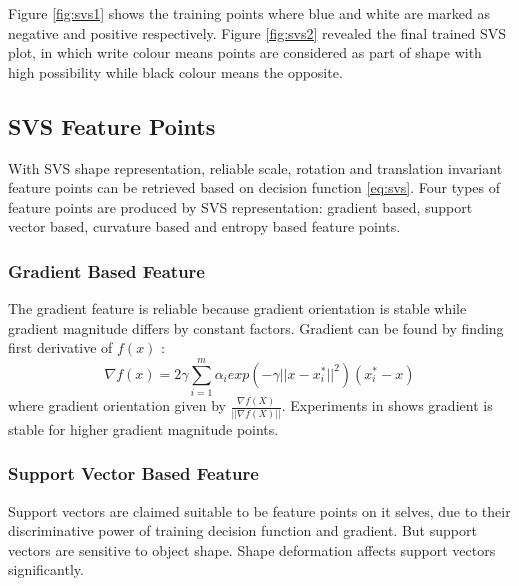 Figure \ref{fig:svs1} shows the training points where blue and white are marked as negative and positive respectively. Figure \ref{fig:svs2} revealed the final trained SVS plot, in which write colour means points are considered as part of shape with high possibility while black colour means the opposite.

\subsection{SVS Feature Points}
With SVS shape representation, reliable scale, rotation and translation invariant feature points can be retrieved based on decision function \ref{eq:svs}. Four types of feature points are produced by SVS representation: gradient based, support vector based, curvature based and entropy based feature points.

\subsubsection{Gradient Based Feature}
The gradient feature is reliable because gradient orientation is stable while gradient magnitude differs by constant factors. Gradient can be found by finding first derivative of $f(x)$ \cite{Nguyen2013}:
\begin{equation}
\label{eq:svsgrad}
\nabla f(x)=2\gamma\sum^m_{i=1}\alpha_iexp(-\gamma||x-x^*_i||^2)(x^*_i-x)
\end{equation}
where gradient orientation given by $\frac{\nabla f(X)}{||\nabla f(X)||}$. Experiments in \cite{Nguyen2013} shows gradient is stable for higher gradient magnitude points.

\subsubsection{Support Vector Based Feature}
Support vectors are claimed suitable to be feature points on it selves, due to their discriminative power of training decision function and gradient. But support vectors are sensitive to object shape. Shape deformation affects support vectors significantly.

